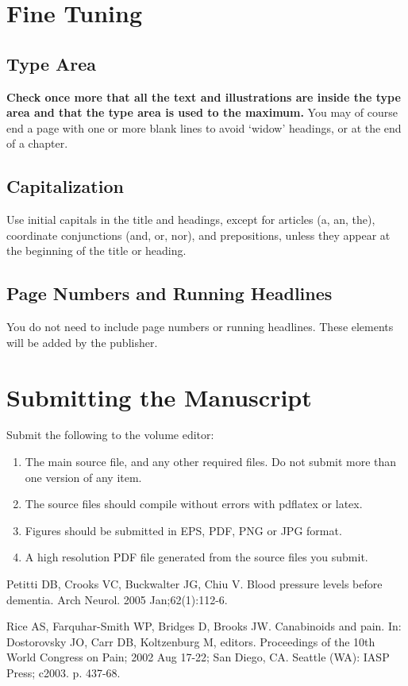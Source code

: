 \documentclass{IOS-Book-Article}
\begin{document}
\section{Fine Tuning}

\subsection{Type Area}
\textbf{Check once more that all the text and illustrations are inside the type area and
that the type area is used to the maximum.} You may of course end a page with one
or more blank lines to avoid `widow' headings, or at the end of a chapter.

\subsection{Capitalization}
Use initial capitals in the title and headings, except for articles (a, an, the), coordinate
conjunctions (and, or, nor), and prepositions, unless they appear at the beginning of the
title or heading.

\subsection{Page Numbers and Running Headlines}
You do not need to include page numbers or running headlines. These elements will be
added by the publisher.

\section{Submitting the Manuscript}
Submit the following to the volume editor:

\begin{enumerate}
\item The main source file, and any other required files. Do not submit more than
one version of any item.

\item The source files should compile without errors with pdflatex or latex.

\item Figures should be submitted in EPS, PDF, PNG or JPG format.

\item A high resolution PDF file generated from the source files you submit.
\end{enumerate}

\begin{thebibliography}{99}


Petitti DB, Crooks VC, Buckwalter JG, Chiu V. Blood pressure levels before dementia.
Arch Neurol. 2005 Jan;62(1):112-6.

Rice AS, Farquhar-Smith WP, Bridges D, Brooks JW. Canabinoids and pain. In: Dostorovsky JO,
Carr DB, Koltzenburg M, editors. Proceedings of the 10th World Congress on Pain;  2002 Aug
17-22; San Diego, CA. Seattle (WA): IASP Press; c2003. p. 437-68.

\end{thebibliography}
\end{document}
